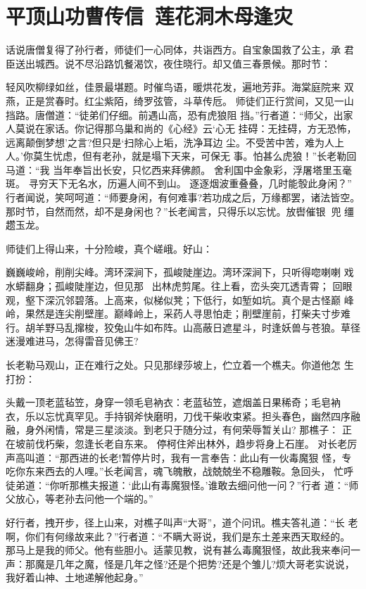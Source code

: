 \chapter{平顶山功曹传信~莲花洞木母逢灾}

话说唐僧复得了孙行者，师徒们一心同体，共诣西方。自宝象国救了公主，承
君臣送出城西。说不尽沿路饥餐渴饮，夜住晓行。却又值三春景候。那时节：

轻风吹柳绿如丝，佳景最堪题。时催鸟语，暖烘花发，遍地芳菲。海棠庭院来
双燕，正是赏春时。红尘紫陌，绮罗弦管，斗草传卮。
师徒们正行赏间，又见一山挡路。唐僧道：“徒弟们仔细。前遇山高，恐有虎狼阻
挡。”行者道：“师父，出家人莫说在家话。你记得那乌巢和尚的《心经》云‘心无
挂碍：无挂碍，方无恐怖，远离颠倒梦想’之言?但只是‘扫除心上垢，洗净耳边
尘。不受苦中苦，难为人上人。’你莫生忧虑，但有老孙，就是塌下天来，可保无
事。怕甚么虎狼！”长老勒回马道：“我
当年奉旨出长安，只忆西来拜佛颜。
舍利国中金象彩，浮屠塔里玉毫斑。
寻穷天下无名水，历遍人间不到山。
逐逐烟波重叠叠，几时能彀此身闲？”
行者闻说，笑呵呵道：“师要身闲，有何难事?若功成之后，万缘都罢，诸法皆空。
那时节，自然而然，却不是身闲也？”长老闻言，只得乐以忘忧。放辔催银，兜
缰趱玉龙。

师徒们上得山来，十分险峻，真个嵯峨。好山：

巍巍峻岭，削削尖峰。湾环深涧下，孤峻陡崖边。湾环深涧下，只听得唿喇喇
戏水蟒翻身；孤峻陡崖边，但见那出林虎剪尾。往上看，峦头突兀透青霄；
回眼观，壑下深沉邻碧落。上高来，似梯似凳；下低行，如堑如坑。真个是古怪巅
峰岭，果然是连尖削壁崖。巅峰岭上，采药人寻思怕走；削壁崖前，打柴夫寸步难
行。胡羊野马乱撺梭，狡兔山牛如布阵。山高蔽日遮星斗，时逢妖兽与苍狼。草径
迷漫难进马，怎得雷音见佛王?

长老勒马观山，正在难行之处。只见那绿莎坡上，伫立着一个樵夫。你道他怎
生打扮：

头戴一顶老蓝毡笠，身穿一领毛皂衲衣：老蓝毡笠，遮烟盖日果稀奇；毛皂衲
衣，乐以忘忧真罕见。手持钢斧快磨明，刀伐干柴收束紧。担头春色，幽然四序融
融，身外闲情，常是三星淡淡。到老只于随分过，有何荣辱暂关山?
那樵子：
正在坡前伐朽柴，忽逢长老自东来。
停柯住斧出林外，趋步将身上石崖。
对长老厉声高叫道：“那西进的长老!暂停片时，我有一言奉告：此山有一伙毒魔狠
怪，专吃你东来西去的人哩。”长老闻言，魂飞魄散，战兢兢坐不稳雕鞍。急回头，
忙呼徒弟道：“你听那樵夫报道：‘此山有毒魔狠怪。’谁敢去细问他一问？”行者
道：“师父放心，等老孙去问他一个端的。”

好行者，拽开步，径上山来，对樵子叫声“大哥”，道个问讯。樵夫答礼道：“长
老啊，你们有何缘故来此？”行者道：“不瞒大哥说，我们是东土差来西天取经的。
那马上是我的师父。他有些胆小。适蒙见教，说有甚么毒魔狠怪，故此我来奉问一
声：那魔是几年之魔，怪是几年之怪?还是个把势?还是个雏儿?烦大哥老实说说，
我好着山神、土地递解他起身。”

